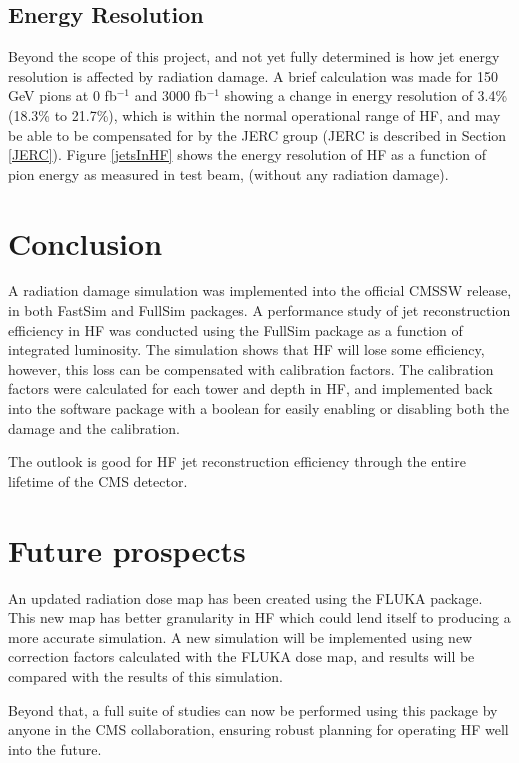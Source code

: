 		\subsection{Energy Resolution}
			Beyond the scope of this project, and not yet fully determined is how jet energy resolution is affected by radiation damage.  A brief calculation was made for 150 GeV pions at 0 fb$^{-1}$ and 3000 fb$^{-1}$ showing a change in energy resolution of 3.4\% (18.3\% to 21.7\%), which is within the normal operational range of HF, and may be able to be compensated for by the JERC group (JERC is described in Section \ref{JERC}).  Figure \ref{jetsInHF} shows the energy resolution of HF as a function of pion energy as measured in test beam, (without any radiation damage).
		
\section{Conclusion}
A radiation damage simulation was implemented into the official CMSSW release, in both FastSim and FullSim packages.  A performance study of jet reconstruction efficiency in HF was conducted using the FullSim package as a function of integrated luminosity.  The simulation shows that HF will lose some efficiency, however, this loss can be compensated with calibration factors.  The calibration factors were calculated for each tower and depth in HF, and implemented back into the software package with a boolean for easily enabling or disabling both the damage and the calibration.

The outlook is good for HF jet reconstruction efficiency through the entire lifetime of the CMS detector.

\section{Future prospects}
An updated radiation dose map has been created using the FLUKA package.  This new map has better granularity in HF which could lend itself to producing a more accurate simulation.  A new simulation will be implemented using new correction factors calculated with the FLUKA dose map, and results will be compared with the results of this simulation.

Beyond that, a full suite of studies can now be performed using this package by anyone in the CMS collaboration, ensuring robust planning for operating HF well into the future.

